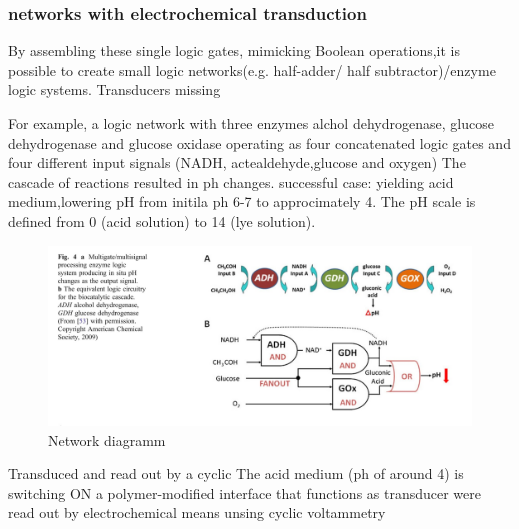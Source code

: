\documentclass[runningheads]{llncs}
\begin{document}
	\subsubsection{networks with electrochemical transduction}
	By assembling these single logic gates, mimicking Boolean operations,it is possible to create small logic networks(e.g. half-adder/ half subtractor)/enzyme logic systems. Transducers missing 
	
	For example, a logic network with three enzymes alchol dehydrogenase, glucose dehydrogenase and glucose oxidase operating as four concatenated logic gates and four different input signals (NADH,  actealdehyde,glucose and oxygen) The cascade of reactions resulted in ph changes. 
	successful case: yielding acid medium,lowering pH from initila ph 6-7 to approcimately 4. The pH scale is defined from 0 (acid solution) to 14 (lye solution).
	
	\begin{figure} \centering \includegraphics[scale= 0.3]{biocomputing_sensor.png} \caption{Network diagramm} \label{img:grafik-test} \end{figure}
	
	
	Transduced and read out by a cyclic
	The acid medium (ph of around 4) is switching ON a polymer-modified interface that functions as transducer were read out by electrochemical means unsing cyclic voltammetry
\end{document}
